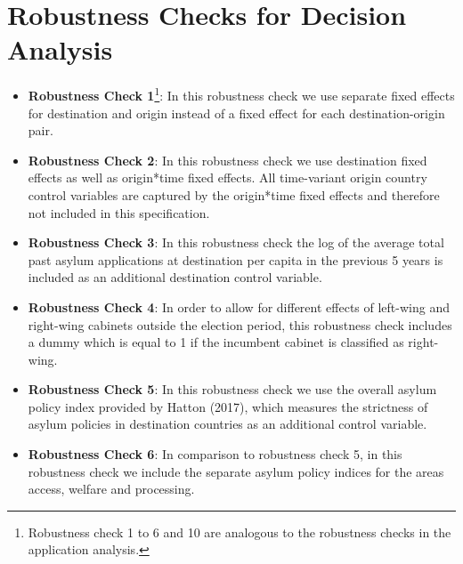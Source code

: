 \documentclass[11pt,a4paper]{scrartcl}
\begin{document}
\clearpage
\FloatBarrier


\clearpage
\FloatBarrier


\clearpage
\FloatBarrier





\clearpage
\FloatBarrier
\section{Robustness Checks for Decision Analysis}


\begin{itemize}
	\itemsep0em
	\item \textbf{Robustness Check 1}\footnote{Robustness check 1 to 6 and 10 are analogous to the robustness checks in the application analysis.}: In this robustness check we use separate fixed effects for destination and origin instead of a fixed effect for each destination-origin pair.
	
	\item \textbf{Robustness Check 2}: In this robustness check we use destination fixed effects as well as origin*time fixed effects. All time-variant origin country control variables are captured by the origin*time fixed effects and therefore not included in this specification. 
	
	\item \textbf{Robustness Check 3}: In this robustness check the log of the average total past asylum applications at destination per capita in the previous 5 years is included as an additional destination control variable. 
	
	\item \textbf{Robustness Check 4}: In order to allow for different effects of left-wing and right-wing cabinets outside the election period, this robustness check includes a dummy which is equal to 1 if the incumbent cabinet is classified as right-wing.   
	
	\item \textbf{Robustness Check 5}: In this robustness check we use the overall asylum policy index provided by Hatton (2017), which measures the strictness of asylum policies in destination countries as an additional control variable.
	
	\item \textbf{Robustness Check 6}: In comparison to robustness check 5, in this robustness check we include the separate asylum policy indices for the areas access, welfare and processing. 
	

\end{itemize}
\end{document}
